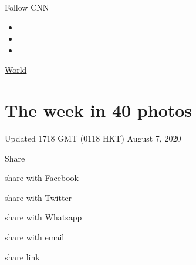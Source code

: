 Follow CNN

\begin{itemize}
\item
\item
\item
\end{itemize}

\href{/world}{World}

\hypertarget{the-week-in-40-photos}{%
\section{The week in 40 photos}\label{the-week-in-40-photos}}

Updated 1718 GMT (0118 HKT) August 7, 2020

Share

share with Facebook

share with Twitter

share with Whatsapp

share with email

share link

